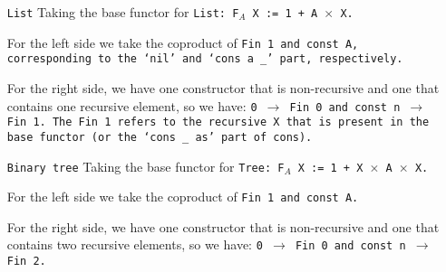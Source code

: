 \begin{itemize}
    \item[\tt{List}]
    Taking the base functor for \tt{List}: \tt{F$_A$ X := 1 + A $\times$ X}.

    For the left side we take the coproduct of \tt{Fin 1} and \tt{const A}, corresponding to the `\tt{nil}' and `\tt{cons a \_}' part, respectively.

    For the right side, we have one constructor that is non-recursive and one that contains one recursive element, so we have:
    \tt{0 $\to$ Fin 0} and \tt{const n $\to$ Fin 1}.
    The Fin 1 refers to the recursive X that is present in the base functor (or the `\tt{cons \_ as}' part of cons).
    \item[\tt{Binary tree}]
    Taking the base functor for \tt{Tree}: \tt{F$_A$ X := 1 + X $\times$ A $\times$ X}.

    For the left side we take the coproduct of \tt{Fin 1} and \tt{const A}.

    For the right side, we have one constructor that is non-recursive and one that contains two recursive elements, so we have:
    \tt{0 $\to$ Fin 0} and \tt{const n $\to$ Fin 2}.
\end{itemize}
\iffalse
- Strictly positive functors
\fi